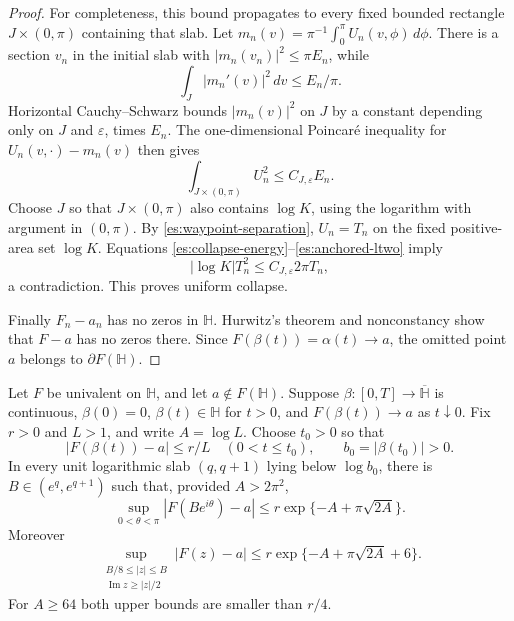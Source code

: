 \begin{proof}
For completeness, this bound propagates to every fixed bounded
rectangle $J\times(0,\pi)$ containing that slab.  Let
$m_n(v)=\pi^{-1}\int_0^\pi U_n(v,\phi)\,d\phi$.
There is a section $v_n$ in the initial slab with
$|m_n(v_n)|^2\le\pi E_n$, while
\[
 \int_J|m_n'(v)|^2\,dv\le E_n/\pi.
\]
Horizontal Cauchy--Schwarz bounds $|m_n(v)|^2$ on $J$ by a constant
depending only on $J$ and $\varepsilon$, times $E_n$.
The one-dimensional Poincar\'e inequality for
$U_n(v,\cdot)-m_n(v)$ then gives
\begin{equation}\label{es:anchored-ltwo}
 \int_{J\times(0,\pi)}U_n^2\le C_{J,\varepsilon}E_n.
\end{equation}
Choose $J$ so that $J\times(0,\pi)$ also contains $\log K$, using the
logarithm with argument in $(0,\pi)$.  By
\eqref{es:waypoint-separation}, $U_n=T_n$ on the
fixed positive-area set $\log K$.  Equations
\eqref{es:collapse-energy}--\eqref{es:anchored-ltwo} imply
\[
 |\log K|T_n^2\le C_{J,\varepsilon}2\pi T_n,
\]
a contradiction.  This proves uniform collapse.

Finally $F_n-a_n$ has no zeros in $\mathbb H$.  Hurwitz's theorem and
nonconstancy show that $F-a$ has no zeros there.  Since
$F(\beta(t))=\alpha(t)\to a$, the omitted point $a$ belongs to
$\partial F(\mathbb H)$.
\end{proof}

\begin{lemma}\label{es:good-semicircle}
Let $F$ be univalent on $\mathbb H$, and let $a\notin F(\mathbb H)$.
Suppose $\beta:[0,T]\to\overline{\mathbb H}$ is continuous,
$\beta(0)=0$, $\beta(t)\in\mathbb H$ for $t>0$, and
$F(\beta(t))\to a$ as $t\downarrow0$.
Fix $r>0$ and $L>1$, and write $A=\log L$.  Choose $t_0>0$ so that
\[
 |F(\beta(t))-a|\le r/L\quad(0<t\le t_0),
 \qquad b_0=|\beta(t_0)|>0.
\]
In every unit logarithmic slab $(q,q+1)$ lying below $\log b_0$,
there is $B\in(e^q,e^{q+1})$ such that, provided $A>2\pi^2$,
\begin{equation}\label{es:semicircle-bound}
 \sup_{0<\theta<\pi}|F(Be^{i\theta})-a|
       \le r\exp\{-A+\pi\sqrt{2A}\}.
\end{equation}
Moreover
\begin{equation}\label{es:sector-bound}
 \sup_{\substack{B/8\le|z|\le B\\
                 \operatorname{Im}z\ge |z|/2}}
 |F(z)-a|
       \le r\exp\{-A+\pi\sqrt{2A}+6\}.
\end{equation}
For $A\ge64$ both upper bounds are smaller than $r/4$.
\end{lemma}

